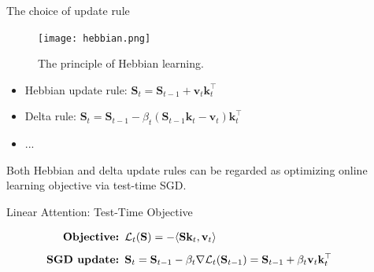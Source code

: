 \begin{frame}{The choice of update rule}
    \begin{figure}
        \centering
        \texttt{[image: hebbian.png]}
        \caption{The principle of Hebbian learning.}
    \end{figure}
    \begin{itemize}
        \item Hebbian update rule: $\mathbf{S}_t = \mathbf{S}_{t-1} + \mathbf{v}_t \mathbf{k}_t^\top$
        \item Delta rule: $\mathbf{S}_t = \mathbf{S}_{t-1} - \beta_t \left(\mathbf{S}_{t-1} \mathbf{k}_t - \mathbf{v}_t\right) \mathbf{k}_t^\top$
        \item ...
    \end{itemize}
    Both Hebbian and delta update rules can be regarded as optimizing online learning objective via {\color{red}test-time SGD}.


\end{frame}
\begin{frame}{Linear Attention: Test-Time Objective}
    \begin{center}
    \end{center}
\vspace{-10mm}
    \begin{align*}
\hspace*{-1cm}\textbf{Objective: } & \mathcal{L}_t(\mathbf{S}) = -\langle \mathbf{S} \mathbf{k}_t, \mathbf{v}_t \rangle \\[1ex]
\hspace*{-1cm}\textbf{SGD update: } & \mathbf{S}_t = \mathbf{S}_{t-1} - \beta_t \nabla \mathcal{L}_t(\mathbf{S}_{t-1}) = \mathbf{S}_{t-1} + \beta_t \mathbf{v}_t \mathbf{k}_t^\top
    \end{align*}
    \vspace{-6mm}

\end{frame}

